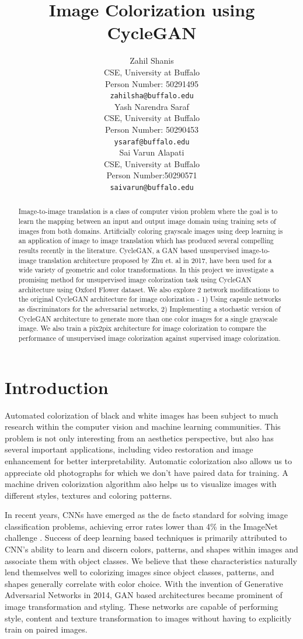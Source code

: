 \documentclass{article} %
\title{Image Colorization using CycleGAN}
\author{
Zahil Shanis \\
CSE, University at Buffalo\\
Person Number: 50291495\\
\texttt{zahilsha@buffalo.edu} \\
\And
Yash Narendra Saraf \\
CSE, University at Buffalo\\
Person Number: 50290453\\
\texttt{ysaraf@buffalo.edu} \\
\And
Sai Varun Alapati \\
CSE, University at Buffalo\\
Person Number:50290571 \\
\texttt{saivarun@buffalo.edu} \\
}
\begin{document}
\maketitle

\begin{abstract}

Image-to-image translation is a class of computer vision problem where the goal is to learn the mapping between an input and output image domain using training sets of images from both domains. Artificially coloring grayscale images using deep learning is an application of image to image translation which has produced several compelling results recently in the literature. CycleGAN\cite{cyclegan}, a GAN based unsupervised image-to-image translation architecture proposed by Zhu et. al in 2017, have been used for a wide variety of geometric and color transformations. In this project we investigate a promising method for unsupervised image colorization task using CycleGAN\cite{cyclegan} architecture using Oxford Flower\cite{flower} dataset. We also explore 2 network modifications to the original CycleGAN architecture for image colorization - 1) Using capsule networks\cite{capsnet} as discriminators for the adversarial networks, 2) Implementing a stochastic version of CycleGAN architecture to generate more than one color images for a single grayscale image. We also train a pix2pix\cite{pix2pix} architecture for image colorization to compare the performance of unsupervised image colorization against supervised image colorization.

\end{abstract}

\section{Introduction}
Automated colorization of black and white images has
been subject to much research within the computer vision
and machine learning communities. This problem is not only interesting from an aesthetics perspective, but also has several important applications, including video restoration and image enhancement for better interpretability. Automatic colorization also allows us to appreciate old photographs for which we don't have paired data for training. A machine driven colorization algorithm also helps us to visualize images with different styles, textures and coloring patterns.


In recent years, CNNs have emerged as the de facto standard for solving image classification problems, achieving
error rates lower than 4\% in the ImageNet challenge \cite{imagenet}. Success of deep learning based techniques is primarily attributed to CNN's ability to learn
and discern colors, patterns, and shapes within images and
associate them with object classes. We believe that these
characteristics naturally lend themselves well to colorizing
images since object classes, patterns, and shapes generally
correlate with color choice. With the invention of Generative Adversarial Networks \cite{gan} in 2014, GAN based architectures became prominent of image transformation and styling. These networks are capable of performing style, content and texture transformation to images without having to explicitly train on paired images.
\end{document}
